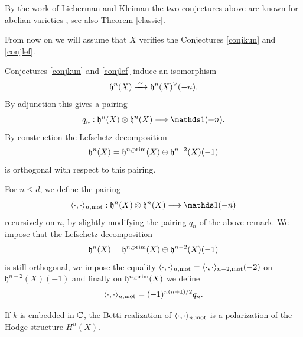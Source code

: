 \documentclass[11pt]{amsart}
\begin{document}
\begin{remark}
By the work of Lieberman and Kleiman the two conjectures above are known for abelian varieties \cite{GKL,Lieb}, see also Theorem \ref{classic}.
\end{remark}
\begin{assumption}\label{kun+lef}
From now on we will assume that $X$ verifies the   Conjectures \ref{conjkun} and \ref{conjlef}.
\end{assumption}
\begin{remark}
Conjectures \ref{conjkun} and \ref{conjlef} induce an isomorphism
\[\mathfrak{h}^n(X) \xrightarrow{\hspace{1.85pt}\sim \hspace{1.85pt}} \mathfrak{h}^{n}(X)^{\vee}(-n).\]
By adjunction this gives a pairing
\[q_n : \mathfrak{h}^n(X) \otimes \mathfrak{h}^{n}(X)  \longrightarrow \one(-n).\]
By construction  the Lefschetz decomposition 
\[\mathfrak{h}^{n }(X)=\mathfrak{h}^{n,\mathrm{prim}}(X) \oplus \mathfrak{h}^{n-2}(X)(-1)\] 
is orthogonal with respect to this pairing.
\end{remark}
\begin{definition}\label{defpairingmot} For $n\leq d$, we define the pairing 
\[\langle \cdot, \cdot \rangle_{n,\mot} : \mathfrak{h}^n(X) \otimes \mathfrak{h}^{n}(X)  \longrightarrow \one(-n)\]
recursively on $n$, by slightly modifying the pairing $q_n$ of the above remark. We impose that  the Lefschetz decomposition 
\[\mathfrak{h}^{n }(X)=\mathfrak{h}^{n,\mathrm{prim}}(X) \oplus \mathfrak{h}^{n-2}(X)(-1)\] 
is still orthogonal, we impose the equality $\langle \cdot, \cdot \rangle_{n,\mathrm{mot}} =\langle \cdot, \cdot \rangle_{n-2,\mathrm{mot}}(-2) $ on $\mathfrak{h}^{n-2}(X)(-1)$  and finally on $\mathfrak{h}^{n,\mathrm{prim}}(X)$ we define \[\langle \cdot, \cdot \rangle_{n,\mathrm{mot}}  = (-1)^{n(n+1)/2}q_n. \]

 \end{definition}
 \begin{remark}\label{rempola}
If $k$ is embedded in $\mathbb{C}$, the Betti realization of $\langle \cdot, \cdot \rangle_{n,\mathrm{mot}}$ is a polarization of the Hodge structure $H^n(X)$.
\end{remark}
\end{document}
